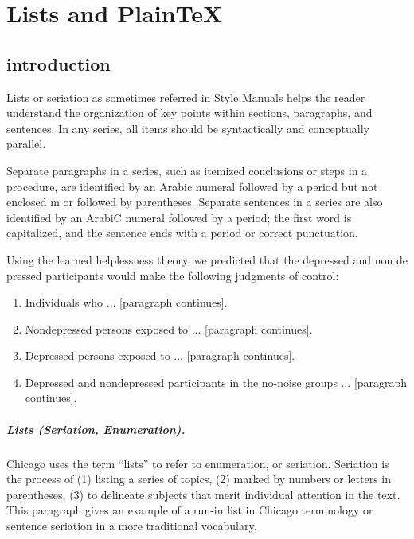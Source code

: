 
\chapter{Lists and PlainTeX}

\newpage

\section{introduction}

Lists or seriation as sometimes referred in Style Manuals helps the reader understand the organization of key points within sections, paragraphs,
and sentences. In any series, all items should be syntactically and conceptually
parallel.

Separate paragraphs in a series, such as itemized conclusions or steps in a procedure,
are identified by an Arabic numeral followed by a period but not enclosed m or
followed by parentheses. Separate sentences in a series are also identified by an ArabiC
numeral followed by a period; the first word is capitalized, and the sentence ends with
a period or correct punctuation.

Using the learned helplessness theory, we predicted that the depressed and
non de pressed participants would make the following judgments of control:

\begin{enumerate}
\item Individuals who ... [paragraph continues].
\item Nondepressed persons exposed to ... [paragraph continues].
\item Depressed persons exposed to ... [paragraph continues].
\item Depressed and nondepressed participants in the no-noise groups ... [paragraph continues].
\end{enumerate}

\paragraph{Lists (Seriation, Enumeration).} Chicago uses the term \enquote{lists} to refer to enumeration, or seriation.
Seriation is the process of (1) listing a series of topics, (2) marked by numbers or letters in parentheses,
(3) to delineate subjects that merit individual attention in the text. This paragraph gives an example of a
run-in list in Chicago terminology or sentence seriation in a more traditional vocabulary.

